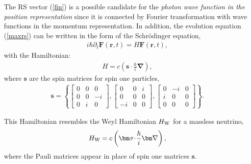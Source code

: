 \documentclass[onecolumn,aps,pra,12pt]{revtex4-1}
\begin{document}
The RS vector (\ref{fin}) is a possible candidate for the {\em photon wave function in the position representation} since it is connected by Fourier transformation with wave functions in the momentum representation. In addition, the evolution equation (\ref{maxrs}) can be written in the form of the Schr\"odinger equation,
\begin{align}\label{seq}
i\hbar\partial_t{\bm F}({\bm r},t)=H {\bm F}({\bm r},t),
\end{align}
with the Hamiltonian:
\begin{eqnarray}\label{maxs}
H=c\left({\bm s}\!\cdot\!\frac{\hbar}{i}{\bm\nabla}\right),
\end{eqnarray}
where ${\bm s}$ are the spin matrices for spin one particles,
\begin{eqnarray}\label{spin}
{\bm s}=\left\{\left[\begin{array}{ccc}
0&0&0\\
0&0&-i\\
0&i&0
\end{array}\right],
\left[\begin{array}{ccc}
0&0&i\\
0&0&0\\
-i&0&0
\end{array}\right],
\left[\begin{array}{ccc}
0&-i&0\\
i&0&0\\
0&0&0
\end{array}\right]\right\}.
\end{eqnarray}
\vspace{0.1cm}

\noindent This Hamiltonian resembles the Weyl Hamiltonian $H_{\rm W}$ for a massless neutrino,
\begin{eqnarray}\label{weyl}
H_{\rm W}=c\left({\bm\sigma}\!\cdot\!\frac{\hbar}{i}{\bm\nabla}\right),
\end{eqnarray}
where the Pauli matrices appear in place of spin one matrices ${\bm s}$.
\end{document}

